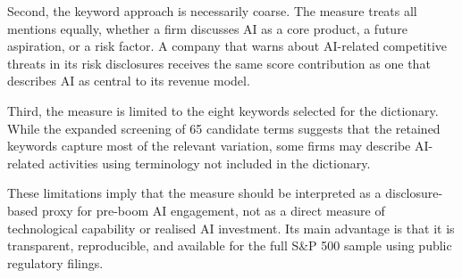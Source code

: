 Second, the keyword approach is necessarily coarse. The measure treats all mentions equally, whether a firm discusses AI as a core product, a future aspiration, or a risk factor. A company that warns about AI-related competitive threats in its risk disclosures receives the same score contribution as one that describes AI as central to its revenue model.

Third, the measure is limited to the eight keywords selected for the dictionary. While the expanded screening of 65 candidate terms suggests that the retained keywords capture most of the relevant variation, some firms may describe AI-related activities using terminology not included in the dictionary.

These limitations imply that the measure should be interpreted as a disclosure-based proxy for pre-boom AI engagement, not as a direct measure of technological capability or realised AI investment. Its main advantage is that it is transparent, reproducible, and available for the full S\&P 500 sample using public regulatory filings.